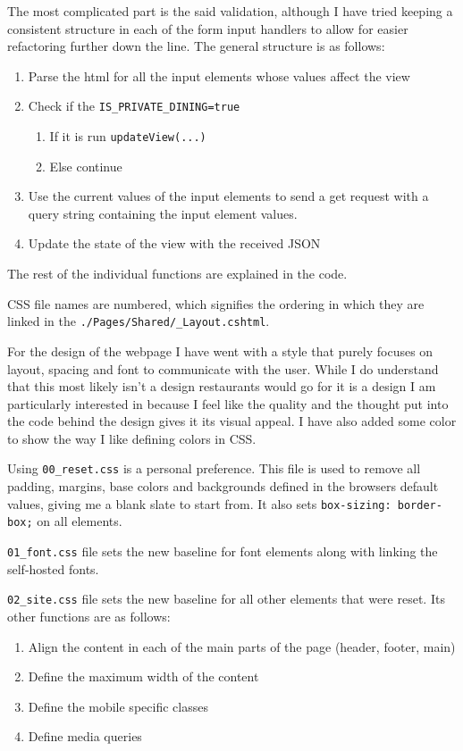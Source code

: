 \documentclass[12pt, a4paper]{article}
\begin{document}
\begin{description}
    The most complicated part is the said validation, although I have tried keeping a consistent structure in each of the form input handlers to allow for easier refactoring further down the line. The general structure is as follows:
    \begin{enumerate}
        \item Parse the html for all the input elements whose values affect the view
        \item Check if the \texttt{IS\_PRIVATE\_DINING=true}
            \begin{enumerate}
                \item If it is run \texttt{updateView(...)}
                \item Else continue
            \end{enumerate}
        \item Use the current values of the input elements to send a get request with a query string containing the input element values.
        \item Update the state of the view with the received JSON
    \end{enumerate}

    The rest of the individual functions are explained in the code.

    \item[\texttt{./wwwroot/css}] CSS file names are numbered, which signifies the ordering in which they are linked in the \texttt{./Pages/Shared/\_Layout.cshtml}.
    
    For the design of the webpage I have went with a style that purely focuses on layout, spacing and font to communicate with the user. While I do understand that this most likely isn't a design restaurants would go for it is a design I am particularly interested in because I feel like the quality and the thought put into the code behind the design gives it its visual appeal. I have also added some color to show the way I like defining colors in CSS.
    
    Using \texttt{00\_reset.css} is a personal preference. This file is used to remove all padding, margins, base colors and backgrounds defined in the browsers default values, giving me a blank slate to start from. It also sets \texttt{box-sizing: border-box;} on all elements.

    \texttt{01\_font.css} file sets the new baseline for font elements along with linking the self-hosted fonts.

    \texttt{02\_site.css} file sets the new baseline for all other elements that were reset. Its other functions are as follows:
    \begin{enumerate}
        \item Align the content in each of the main parts of the page (header, footer, main)
        \item Define the maximum width of the content
        \item Define the mobile specific classes
        \item Define media queries
    \end{enumerate}


\end{description}
\end{document}
